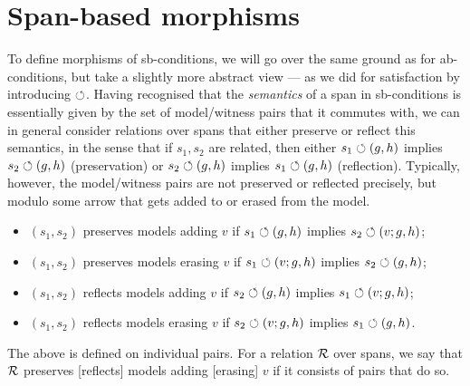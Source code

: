\section{Span-based morphisms}

To define morphisms of sb-conditions, we will go over the same ground as for ab-conditions, but take a slightly more abstract view --- as we did for satisfaction by introducing $\circlearrowleft$. Having recognised that the \emph{semantics} of a span in sb-conditions is essentially given by the set of model/witness pairs that it commutes with, we can in general consider relations over spans that either preserve or reflect this semantics, in the sense that if $s_1,s_2$ are related, then either $s_1\circlearrowleft (g,h)$ implies $s_2\circlearrowleft (g,h)$ (preservation) or $s_2\circlearrowleft (g,h)$ implies $s_1\circlearrowleft (g,h)$ (reflection). Typically, however, the model/witness pairs are not preserved or reflected precisely, but modulo some arrow that gets added to or erased from the model.
%
\begin{itemize}
\item $(s_1,s_2)$ preserves models adding $v$ if $s_1\circlearrowleft (g,h)$ implies $s_2\circlearrowleft (v;g,h)$;
\item $(s_1,s_2)$ preserves models erasing $v$ if $s_1\circlearrowleft (v;g,h)$ implies $s_2\circlearrowleft (g,h)$;
\item $(s_1,s_2)$ reflects models adding $v$ if $s_2\circlearrowleft (g,h)$ implies $s_1\circlearrowleft (v;g,h)$;
\item $(s_1,s_2)$ reflects models erasing $v$ if $s_2\circlearrowleft (v;g,h)$ implies $s_1\circlearrowleft (g,h)$.
\end{itemize}
%
The above is defined on individual pairs. For a relation $\mathcal{R}$ over spans, we say that $\mathcal{R}$ preserves [reflects] models adding [erasing] $v$ if it consists of pairs that do so.

